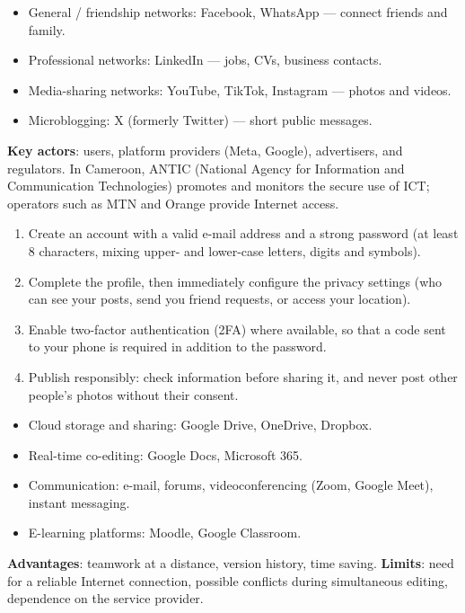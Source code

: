\documentclass[11pt]{article}
\newcommand{\cle}[1]{{\popxbold\color{popdark}#1}}
\begin{document}
\begin{aretenir}
\begin{itemize}
\item \cle{General / friendship networks}: Facebook, WhatsApp --- connect friends and family.
\item \cle{Professional networks}: LinkedIn --- jobs, CVs, business contacts.
\item \cle{Media-sharing networks}: YouTube, TikTok, Instagram --- photos and videos.
\item \cle{Microblogging}: X (formerly Twitter) --- short public messages.
\end{itemize}
\textbf{Key actors}: users, platform providers (Meta, Google), advertisers, and regulators. In Cameroon, \cle{ANTIC} (National Agency for Information and Communication Technologies) promotes and monitors the secure use of ICT; operators such as MTN and Orange provide Internet access.
\end{aretenir}

\begin{methode}
\begin{enumerate}
\item Create an account with a valid e-mail address and a \cle{strong password} (at least 8 characters, mixing upper- and lower-case letters, digits and symbols).
\item Complete the profile, then immediately configure the \cle{privacy settings} (who can see your posts, send you friend requests, or access your location).
\item Enable \cle{two-factor authentication} (2FA) where available, so that a code sent to your phone is required in addition to the password.
\item Publish responsibly: check information before sharing it, and never post other people's photos without their consent.
\end{enumerate}
\end{methode}

\begin{aretenir}
\begin{itemize}
\item \cle{Cloud storage and sharing}: Google Drive, OneDrive, Dropbox.
\item \cle{Real-time co-editing}: Google Docs, Microsoft 365.
\item \cle{Communication}: e-mail, forums, videoconferencing (Zoom, Google Meet), instant messaging.
\item \cle{E-learning platforms}: Moodle, Google Classroom.
\end{itemize}
\textbf{Advantages}: teamwork at a distance, version history, time saving. \textbf{Limits}: need for a reliable Internet connection, possible conflicts during simultaneous editing, dependence on the service provider.
\end{aretenir}
\end{document}
